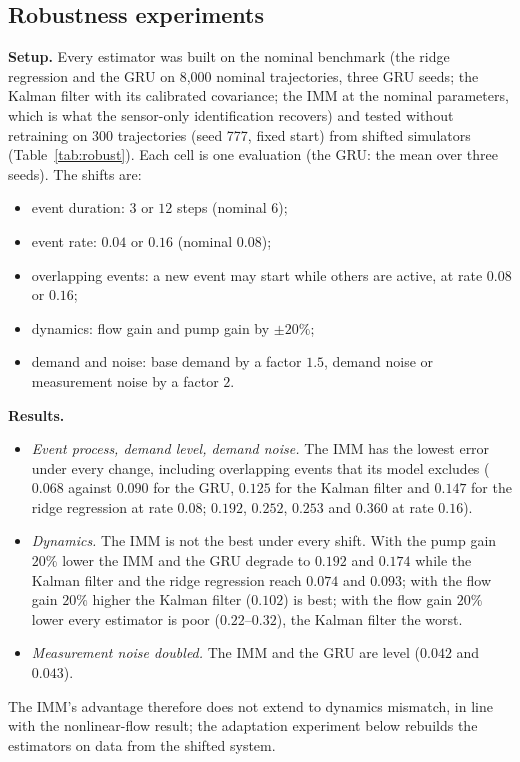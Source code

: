 \documentclass[conference]{IEEEtran}
\begin{document}
\subsection*{Robustness experiments}
\textbf{Setup.} Every estimator was built on the nominal benchmark (the ridge regression and the GRU on 8,000 nominal trajectories, three GRU seeds; the Kalman filter with its calibrated covariance; the IMM at the nominal parameters, which is what the sensor-only identification recovers) and tested without retraining on 300 trajectories (seed 777, fixed start) from shifted simulators (Table~\ref{tab:robust}). Each cell is one evaluation (the GRU: the mean over three seeds). The shifts are:
\begin{itemize}
\item event duration: $3$ or $12$ steps (nominal $6$);
\item event rate: $0.04$ or $0.16$ (nominal $0.08$);
\item overlapping events: a new event may start while others are active, at rate $0.08$ or $0.16$;
\item dynamics: flow gain and pump gain by $\pm20\%$;
\item demand and noise: base demand by a factor $1.5$, demand noise or measurement noise by a factor $2$.
\end{itemize}

\textbf{Results.}
\begin{itemize}
\item \emph{Event process, demand level, demand noise.} The IMM has the lowest error under every change, including overlapping events that its model excludes ($0.068$ against $0.090$ for the GRU, $0.125$ for the Kalman filter and $0.147$ for the ridge regression at rate $0.08$; $0.192$, $0.252$, $0.253$ and $0.360$ at rate $0.16$).
\item \emph{Dynamics.} The IMM is not the best under every shift. With the pump gain $20\%$ lower the IMM and the GRU degrade to $0.192$ and $0.174$ while the Kalman filter and the ridge regression reach $0.074$ and $0.093$; with the flow gain $20\%$ higher the Kalman filter ($0.102$) is best; with the flow gain $20\%$ lower every estimator is poor ($0.22$--$0.32$), the Kalman filter the worst.
\item \emph{Measurement noise doubled.} The IMM and the GRU are level ($0.042$ and $0.043$).
\end{itemize}
The IMM's advantage therefore does not extend to dynamics mismatch, in line with the nonlinear-flow result; the adaptation experiment below rebuilds the estimators on data from the shifted system.
\end{document}
